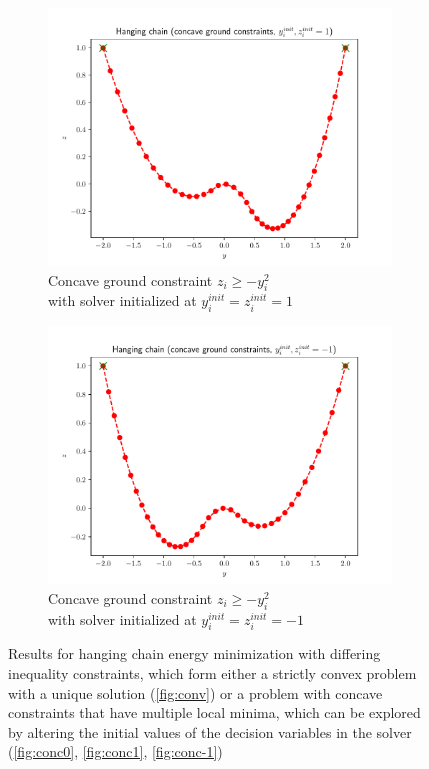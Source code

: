 \documentclass[oneside, a4paper]{book}
\begin{document}
\begin{figure}[H]
  \begin{subfigure}[t]{.5\textwidth}
    \centering
    \includegraphics[width=\linewidth]{concave1.pdf}
    \caption{Concave ground constraint $z_i\geq-y_i^2$ \\with solver initialized at $y_i^{init}=z_i^{init}=1$}
    \label{fig:conc1}
  \end{subfigure}%
  \begin{subfigure}[t]{.5\textwidth}
    \centering
    \includegraphics[width=\linewidth]{concave-1.pdf}
    \caption{Concave ground constraint $z_i\geq-y_i^2$ \\with solver initialized at $y_i^{init}=z_i^{init}=-1$}
    \label{fig:conc-1}
  \end{subfigure}
  \caption{Results for hanging chain energy minimization with differing inequality constraints, which form either a strictly convex problem with a unique solution (\autoref{fig:conv}) or a problem with concave constraints that have multiple local minima, which can be explored by altering the initial values of the decision variables in the solver (\autoref{fig:conc0}, \autoref{fig:conc1}, \autoref{fig:conc-1})}
  \label{fig:hanging-chain}
\end{figure}
\end{document}
